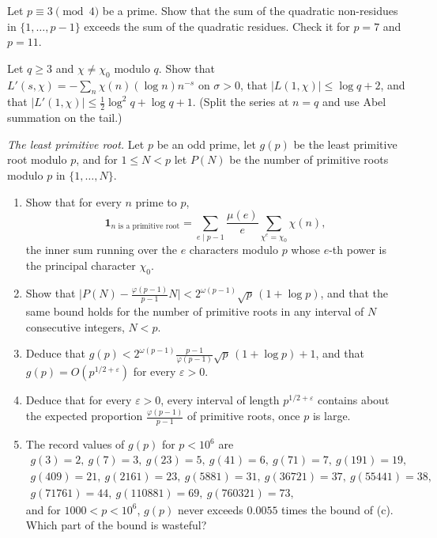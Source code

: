 \begin{exercise}[$\star\star$]\label{ex:residuesum}
Let $p\equiv3\pmod4$ be a prime. Show that the sum of the quadratic non-residues in $\{1,\dots,p-1\}$ exceeds the sum of the quadratic
residues. Check it for $p=7$ and $p=11$.
\end{exercise}

\begin{exercise}[$\star\star$]\label{ex:lderivative}
Let $q\ge3$ and $\chi\ne\chi_0$ modulo $q$. Show that $L'(s,\chi)=-\sum_n\chi(n)(\log n)n^{-s}$ on $\sigma>0$, that $|L(1,\chi)|\le\log q+2$, and that
$|L'(1,\chi)|\le\frac12\log^2q+\log q+1$. (Split the series at $n=q$ and use Abel summation on the tail.)
\end{exercise}

\begin{exercise}[Journey]\label{pb:primroot}
\emph{The least primitive root.} Let $p$ be an odd prime, let $g(p)$ be the least primitive root modulo $p$, and for $1\le N<p$ let $P(N)$ be the number of primitive
roots modulo $p$ in $\{1,\dots,N\}$.
\begin{enumerate}[label=(\alph*)]
\item Show that for every $n$ prime to $p$,
\[
\mathbf 1_{\text{$n$ is a primitive root}}=\sum_{e\mid p-1}\frac{\mu(e)}e\sum_{\chi^e=\chi_0}\chi(n),
\]
the inner sum running over the $e$ characters modulo $p$ whose $e$-th power is the principal character $\chi_0$.
\item Show that $\bigl|P(N)-\frac{\varphi(p-1)}{p-1}N\bigr|<2^{\omega(p-1)}\sqrt p\,(1+\log p)$, and that the same bound holds for the number of primitive roots in any
interval of $N$ consecutive integers, $N<p$.
\item Deduce that $g(p)<2^{\omega(p-1)}\frac{p-1}{\varphi(p-1)}\sqrt p\,(1+\log p)+1$, and that $g(p)=O(p^{1/2+\varepsilon})$ for every $\varepsilon>0$.
\item Deduce that for every $\varepsilon>0$, every interval of length $p^{1/2+\varepsilon}$ contains about the expected proportion $\frac{\varphi(p-1)}{p-1}$ of
primitive roots, once $p$ is large.
\item The record values of $g(p)$ for $p<10^6$ are
\[
\begin{gathered}
g(3)=2,\ g(7)=3,\ g(23)=5,\ g(41)=6,\ g(71)=7,\ g(191)=19,\\
g(409)=21,\ g(2161)=23,\ g(5881)=31,\ g(36721)=37,\ g(55441)=38,\\
g(71761)=44,\ g(110881)=69,\ g(760321)=73,
\end{gathered}
\]
and for $1000<p<10^6$, $g(p)$ never exceeds $0.0055$ times the bound of (c). Which part of the bound is wasteful?
\end{enumerate}
\end{exercise}

